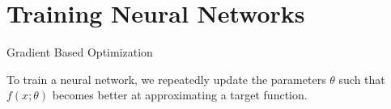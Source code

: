 \section{Training Neural Networks}

\begin{frame}[t]{Gradient Based Optimization}

To train a neural network, we repeatedly update the parameters $\theta$ such that $f(x; \theta)$ becomes better at approximating a target function. 



\end{frame}
